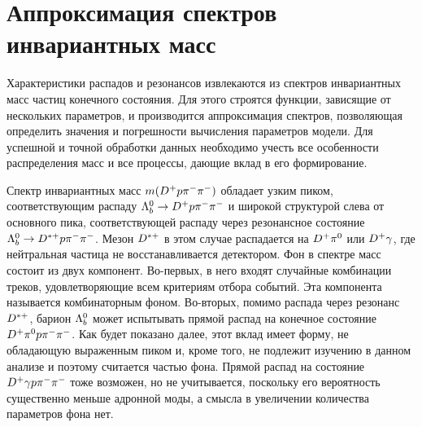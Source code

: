 \clearpage
\section{Аппроксимация спектров инвариантных масс}
\label{sec:fitting}

Характеристики распадов и резонансов извлекаются из спектров 
инвариантных масс частиц конечного состояния. Для этого строятся 
функции, зависящие от нескольких параметров, и производится 
аппроксимация спектров, позволяющая определить значения и погрешности 
вычисления параметров модели. Для успешной и точной обработки данных 
необходимо учесть все особенности распределения масс и все процессы, 
дающие вклад в его формирование.

\label{sec:fitting:lb-dppipi}

Спектр инвариантных масс $m({D^+}{p}{\pi^-}{\pi^-})$ обладает узким пиком, 
соответствующим распаду $\Lb\to\Dp\p\pim\pim$ и широкой структурой слева 
от основного пика, соответствующей распаду через резонансное состояние 
$\Lb\to\Dstarp\p\pim\pim$. Мезон ${D^{*+}}$ в этом случае распадается на 
${D^+}{\pi^0}$ или ${D^+}\gamma$, где нейтральная частица не восстанавливается 
детектором. Фон в спектре масс состоит из двух компонент. Во-первых, 
в него входят случайные комбинации треков, удовлетворяющие всем 
критериям отбора событий. Эта компонента называется комбинаторным фоном. 
Во-вторых, помимо распада через резонанс ${D^{*+}}$, барион ${\Lambda_b^0}$ может 
испытывать прямой распад на конечное состояние ${D^+}{\pi^0}{p}{\pi^-}{\pi^-}$. Как 
будет показано далее, этот вклад имеет форму, не обладающую выраженным 
пиком и, кроме того, не подлежит изучению в данном анализе и поэтому 
считается частью фона. Прямой распад на состояние ${D^+}\gamma{p}{\pi^-}{\pi^-}$ 
тоже возможен, но не учитывается, поскольку его вероятность существенно 
меньше адронной моды, а смысла в увеличении количества параметров фона 
нет.

